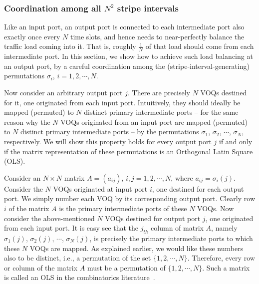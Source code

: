   
















\subsubsection{Coordination among all $N^2$ stripe intervals}
\label{sec:OLS}



Like an input port, an output port is connected to each intermediate port also exactly once every $N$
time slots, and hence needs to near-perfectly balance the traffic load coming into it.  That is, roughly $\frac{1}{N}$ of 
that load should come from each intermediate port.  In this section, we show how to achieve such load balancing at
an output port, by a careful coordination among the (stripe-interval-generating) permutations $\sigma_i$, $i = 1, 2, \cdots, N$.

Now consider an arbitrary output port $j$.  There are precisely $N$ VOQs destined for it, one originated from 
each input port.  Intuitively, they should ideally be mapped (permuted) to $N$ distinct primary intermediate ports 
-- for the same reason why the $N$ VOQs originated from an
input port are mapped (permuted) to $N$ distinct primary intermediate ports --
by the permutations $\sigma_1$, $\sigma_2$, $\cdots$, $\sigma_N$, respectively.  We will show this property 
holds for every output port $j$ if and only if the matrix representation of these permutations is an
Orthogonal Latin Square (OLS).

Consider an 
$N \times N$
matrix $A = (a_{ij})$, $i, j = 1, 2, \cdots, N$,  
where $a_{ij} = \sigma_i(j)$.
Consider the $N$ VOQs originated at input port $i$, one destined for each output port.  
We simply number 
each VOQ by its corresponding output port.
Clearly row $i$ of the matrix $A$ is the primary intermediate 
ports of these $N$ VOQs.   Now consider the above-mentioned $N$ VOQs destined for output port $j$, one originated from
each input port.   It is easy 
see that the $j_{th}$ column of matrix $A$, namely 
$\sigma_1(j)$, $\sigma_2(j)$, $\cdots$, $\sigma_N(j)$, is precisely the primary intermediate ports to which these
$N$ VOQs are mapped.  As explained earlier, we would like these numbers also to be distinct, i.e., a permutation of the set $\{1, 2, \cdots, N\}$.
Therefore, every row or column of the matrix $A$ must be a permutation of $\{1, 2, \cdots, N\}$.  Such a matrix is called an 
OLS in the combinatorics literature~\cite{colbourn1996crc}.




